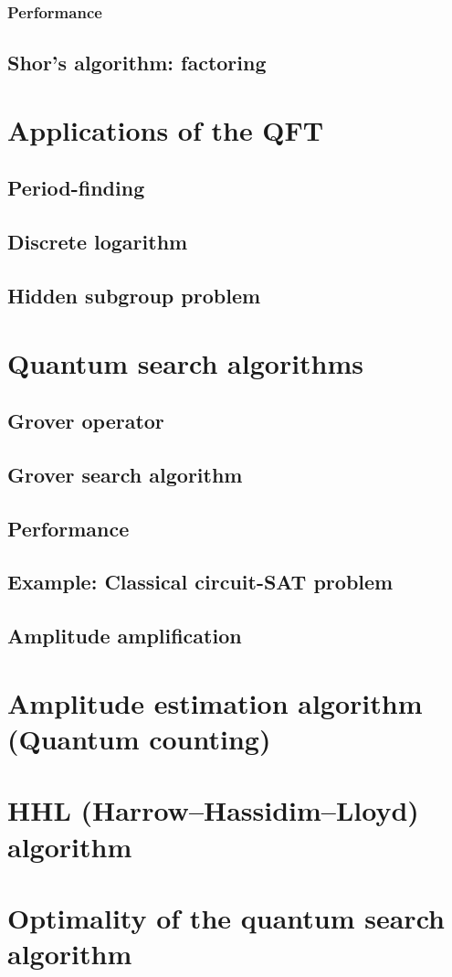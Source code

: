 \subsubsection{Performance}

\subsection{Shor’s algorithm: factoring}


\section{Applications of the QFT}
\subsection{Period-finding}
\subsection{Discrete logarithm}
\subsection{Hidden subgroup problem}




\section{Quantum search algorithms}
\subsection{Grover operator}
\subsection{Grover search algorithm}
\subsection{Performance}

\subsection{Example: Classical circuit-SAT problem}
\subsection{Amplitude amplification}

\section{Amplitude estimation algorithm (Quantum counting)}

\section{HHL (Harrow–Hassidim–Lloyd) algorithm}

\section{Optimality of the quantum search algorithm}